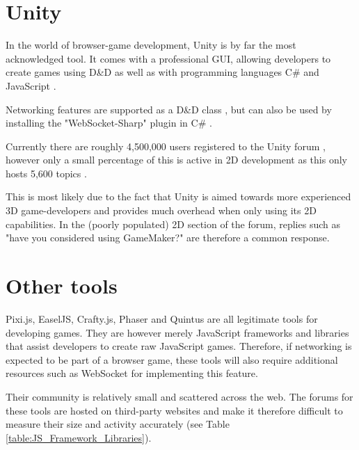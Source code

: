 \documentclass[bsc, 12pt, twoside, singlespacing, parskip, abbrevs, notimes, normalheadings, logo]{styles/infthesis}
\begin{document}
\section{Unity}
In the world of browser-game development, Unity is by far the most acknowledged tool. It comes with a professional GUI, allowing developers to create games using D\&D as well as with programming languages C\# and JavaScript \cite{unity_support}.

Networking features are supported as a D\&D class \cite{unity_networking}, but can also be used by installing the "WebSocket-Sharp" plugin in C\# \cite{unity_websocket_sharp}.

Currently there are roughly 4,500,000 users registered \cite{unity_stats} to the Unity forum \cite{unity_forum}, however only a small percentage of this is active in 2D development as this only hosts 5,600 topics \cite{unity_forum_2d}. 

This is most likely due to the fact that Unity is aimed towards more experienced 3D game-developers and provides much overhead when only using its 2D capabilities. In the (poorly populated) 2D section of the forum, replies such as "have you considered using GameMaker?" \cite{unity_suggests_gamemaker} are therefore a common response.


\section{Other tools}
Pixi.js, EaselJS, Crafty.js, Phaser and Quintus are all legitimate tools for developing games. They are however merely JavaScript frameworks and libraries that assist developers to create raw JavaScript games. Therefore, if networking is expected to be part of a browser game, these tools will also require additional resources such as WebSocket for implementing this feature.

Their community is relatively small and scattered across the web. The forums for these tools are hosted on third-party websites and make it therefore difficult to measure their size and activity accurately (see Table \ref{table:JS_Framework_Libraries}).
\end{document}
